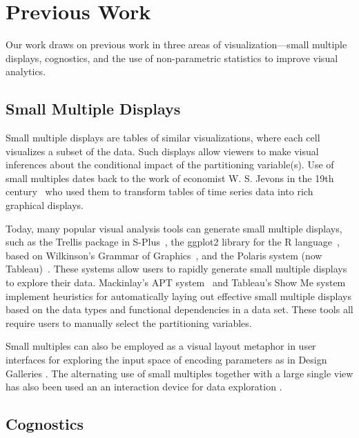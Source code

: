 \section{Previous Work}
\label{sec:related}
Our work draws on previous work in three areas of visualization---small multiple displays, cognostics, and the use of non-parametric statistics to improve visual analytics.

\subsection{Small Multiple Displays}
Small multiple displays are tables of similar visualizations, where each cell visualizes a subset of the data. Such displays allow viewers to make visual inferences about the conditional impact of the partitioning variable(s). Use of small multiples dates back to the work of economist W. S. Jevons in the 19th century~\cite{Kelley1973} who used them to transform tables of time series data into rich graphical displays. 

Today, many popular visual analysis tools can generate small multiple displays, such as the Trellis package in S-Plus~\cite{Becker1996-manual}, the ggplot2 library for the R language~\cite{Wickham2006}, based on Wilkinson's Grammar of Graphics~\cite{Wilkinson2005}, and the Polaris system (now Tableau)~\cite{Stolte2002}. These systems allow users to rapidly generate small multiple displays to explore their data.
Mackinlay's APT system~\cite{mackinlay1986} and Tableau's Show Me system~\cite{mackinlay2007} implement heuristics for automatically laying out effective small multiple displays based on the data types and functional dependencies in a data set.
These tools all require users to manually select the partitioning variables.


Small multiples can also be employed as a visual layout metaphor in user interfaces for exploring the input space of encoding parameters as in Design Galleries \cite{marks1997}. The alternating use of small multiples together with a large single view has also been used an an interaction device for data exploration \cite{van2013}.

\subsection{Cognostics}

